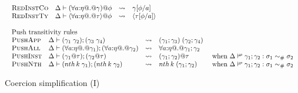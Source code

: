 \documentclass[a4paper,UKenglish]{lipics}
\makeatletter
\def\fiddle#1{\hspace*{-0.8ex}\raisebox{0.1ex}{$\scriptscriptstyle#1$}}
\def\rulename#1{\textsc{#1}}
\newcommand{\wfco}{\vdash^{\fiddle{\sf{co}}}}
\newcommand{\psim}{\mathrel{\sim_{\tiny \#}}}
\def\rulename#1{\textsc{#1}}
\newcommand{\nth}[2]{\mathop{nth} #1\;#2}
\newcommand{\inst}[2]{#1@#2}
\newcommand{\refl}[1]{\langle#1\rangle}  %
\newcommand{\rsa}[1]{\rightsquigarrow_{#1}}
\makeatother
\begin{document}
\begin{figure}
\[\begin{array}{l}
\begin{array}{llcl}
\rulename{RedInstCo}  & \Delta \vdash \inst{(\forall a{:}\eta @.@ \gamma)}{\phi} & \rsa{} & \gamma[\phi/a] \\  
\rulename{RedInstTy}  & \Delta \vdash \inst{\refl{\forall a{:}\eta @.@ \tau}}{\phi} & \rsa{} & \refl{\tau[\phi/a]}
\end{array} \\ \\ 
\begin{array}{llcll}
\multicolumn{4}{l}{\text{Push transitivity rules }} \\
\rulename{PushApp} & \Delta \vdash (\gamma_1\;\gamma_2);(\gamma_3\;\gamma_4) & \rsa{} & (\gamma_1;\gamma_3)\;(\gamma_2;\gamma_4) \\ 
\rulename{PushAll} & \Delta \vdash (\forall a{:}\eta @.@ \gamma_1); (\forall a{:}\eta @.@ \gamma_2) & \rsa{} & \forall a{:}\eta @.@ \gamma_1;\gamma_2 \\ 
\rulename{PushInst}& \Delta \vdash (\inst{\gamma_1}{\tau});(\inst{\gamma_2}{\tau}) & \rsa{} & \inst{(\gamma_1;\gamma_2)}{\tau}  
                                                              & \text{ when } \Delta \wfco \gamma_1;\gamma_2 : \sigma_1 \psim \sigma_2 \\ 
\rulename{PushNth} & \Delta \vdash (\nth{k}{\gamma_1});(\nth{k}{\gamma_2})   & \rsa{} & \nth{k}{(\gamma_1;\gamma_2)}
                                                               & \text{ when } \Delta \wfco \gamma_1;\gamma_2 : \sigma_1 \psim \sigma_2 
\end{array}
\end{array}\]\caption{Coercion simplification (I)}\label{fig:optimization1}
\end{figure}
\end{document}
